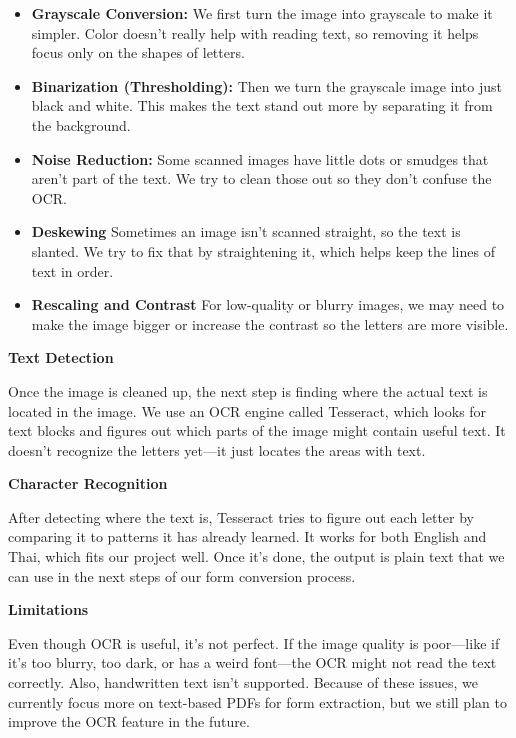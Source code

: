 \documentclass[12pt,oneside,openright,a4paper]{cpe-english-project}
\begin{document}
\begin{itemize}
\item  \textbf{Grayscale Conversion:} We first turn the image into grayscale to make it simpler. Color doesn’t really help with reading text, so removing it helps focus only on the shapes of letters.

\item \textbf{Binarization (Thresholding):} Then we turn the grayscale image into just black and white. This makes the text stand out more by separating it from the background.

\item \textbf{Noise Reduction:} Some scanned images have little dots or smudges that aren’t part of the text. We try to clean those out so they don’t confuse the OCR.

\item \textbf{Deskewing}  Sometimes an image isn’t scanned straight, so the text is slanted. We try to fix that by straightening it, which helps keep the lines of text in order.

\item \textbf{Rescaling and Contrast} For low-quality or blurry images, we may need to make the image bigger or increase the contrast so the letters are more visible.

\end{itemize}

\textbf{Text Detection}

Once the image is cleaned up, the next step is finding where the actual text is located in the image. We use an OCR engine called Tesseract, which looks for text blocks and figures out which parts of the image might contain useful text. It doesn’t recognize the letters yet—it just locates the areas with text.

\textbf{Character Recognition}

After detecting where the text is, Tesseract tries to figure out each letter by comparing it to patterns it has already learned. It works for both English and Thai, which fits our project well. Once it's done, the output is plain text that we can use in the next steps of our form conversion process.

\textbf{Limitations}

Even though OCR is useful, it's not perfect. If the image quality is poor—like if it’s too blurry, too dark, or has a weird font—the OCR might not read the text correctly. Also, handwritten text isn’t supported. Because of these issues, we currently focus more on text-based PDFs for form extraction, but we still plan to improve the OCR feature in the future.
\end{document}
